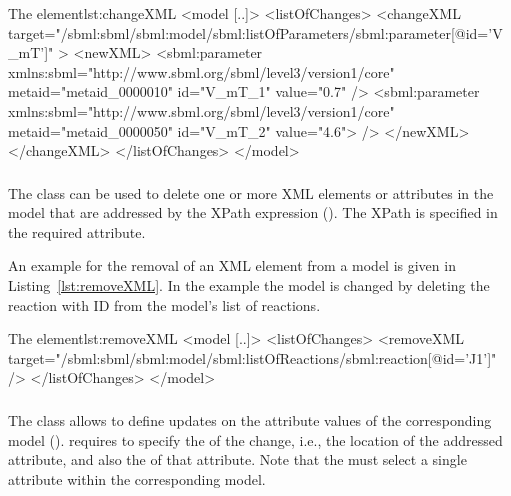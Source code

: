 \begin{myXmlLst}{The  element}{lst:changeXML}
<model [..]>
	<listOfChanges>
		<changeXML target="/sbml:sbml/sbml:model/sbml:listOfParameters/sbml:parameter[@id='V_mT']" >
			<newXML>
				<sbml:parameter xmlns:sbml="http://www.sbml.org/sbml/level3/version1/core"
				                metaid="metaid_0000010" id="V_mT_1" value="0.7" />
				<sbml:parameter xmlns:sbml="http://www.sbml.org/sbml/level3/version1/core"
				                metaid="metaid_0000050" id="V_mT_2" value="4.6"> />
			</newXML>
		</changeXML>
	</listOfChanges>
</model>
\end{myXmlLst}


\subsubsection{}
\label{class:removeXml}
The  class can be used to delete one or more XML elements or attributes in the model that are addressed by the XPath expression (). The XPath is specified in the required \hyperref[sec:changeTarget]{} attribute.

An example for the removal of an XML element from a model is given in Listing~\ref{lst:removeXML}. In the example the model is changed by deleting the reaction with ID  from the model's list of reactions.

\begin{myXmlLst}{The  element}{lst:removeXML}
<model [..]>
	<listOfChanges>
		<removeXML target="/sbml:sbml/sbml:model/sbml:listOfReactions/sbml:reaction[@id='J1']" />
	</listOfChanges>
</model>
\end{myXmlLst}


\subsubsection{}
\label{class:changeAttribute}
The  class allows to define updates on the attribute values of the corresponding model ().  requires to specify the \hyperref[sec:changeTarget]{} of the change, i.e., the location of the addressed attribute, and also the \hyperref[sec:newValue]{} of that attribute. Note that the \hyperref[sec:changeTarget]{} must select a single attribute within the corresponding model.

